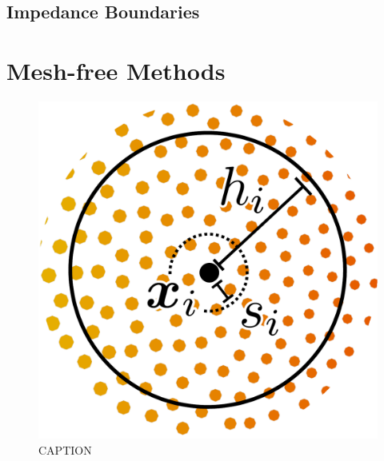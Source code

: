 \subsection{Impedance Boundaries}




\section{Mesh-free Methods}

\cite{monaghan1992SmoothedParticleHydrodynamics, vacondio2021GrandChallengesSmoothed}


\begin{figure}[t]
\centering
\includegraphics[scale=0.175]{assets/imgs/labfm-stencil-drawn_simple.pdf}
\caption{CAPTION}
\label{fig:labfm-stencil}
\end{figure}
        
    